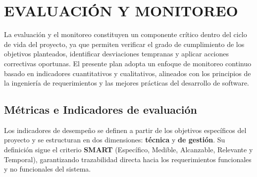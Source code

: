 \newpage
\chapter{EVALUACIÓN Y MONITOREO}
La evaluación y el monitoreo constituyen un componente crítico dentro del ciclo de vida del
proyecto, ya que permiten verificar el grado de cumplimiento de los objetivos planteados,
identificar desviaciones tempranas y aplicar acciones correctivas oportunas. El presente plan
adopta un enfoque de monitoreo continuo basado en indicadores cuantitativos y cualitativos,
alineados con los principios de la ingeniería de requerimientos y las mejores prácticas del
desarrollo de software.

\section{Métricas e Indicadores de evaluación }

Los indicadores de desempeño se definen a partir de los objetivos específicos del proyecto
y se estructuran en dos dimensiones: \textbf{técnica} y \textbf{de gestión}.
Su definición sigue el criterio \textbf{SMART} (Específico, Medible, Alcanzable, Relevante y
Temporal), garantizando trazabilidad directa hacia los requerimientos funcionales y no
funcionales del sistema.

